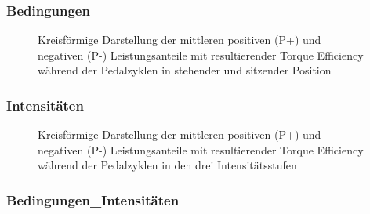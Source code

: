 \documentclass[
  letterpaper,
  DIV=11]{scrartcl}
\begin{document}
\subsubsection{Bedingungen}

\begin{figure}


\caption{\label{fig-Eff_KD_Bedingung}Kreisförmige Darstellung der
mittleren positiven (P+) und negativen (P-) Leistungsanteile mit
resultierender Torque Efficiency während der Pedalzyklen in stehender
und sitzender Position}

\end{figure}%

\subsubsection{Intensitäten}

\begin{figure}


\caption{\label{fig-Eff_KD_Intensität}Kreisförmige Darstellung der
mittleren positiven (P+) und negativen (P-) Leistungsanteile mit
resultierender Torque Efficiency während der Pedalzyklen in den drei
Intensitätsstufen}

\end{figure}%

\subsubsection{Bedingungen\_Intensitäten}
\end{document}
